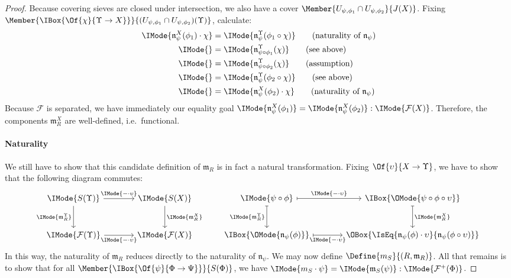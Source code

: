 \documentclass{article}
\newcommand\AIsEq[2]{\IMode{#1} &=\IMode{#2}}
\newcommand\Plus[1]{{#1}^+}
\newcommand\IsEqOf[3]{\IMode{#1}=\IMode{#2}:\IMode{#3}}
\begin{document}
\begin{proof}
  Because covering sieves are closed under intersection, we also have
  a cover $\Member{U_{\psi,\phi_1}\cap U_{\psi,\phi_2}}{J(X)}$. Fixing
  $\Member{\IBox{\Of{\chi}{\Upsilon\to X}}}{(U_{\psi,\phi_1}\cap
    U_{\psi,\phi_2})(\Upsilon)}$, calculate:
  \begin{align*}
    \AIsEq{
      \mathfrak{n}_\psi^X(\phi_1)\cdot \chi
    }{
      \mathfrak{n}_\psi^\Upsilon(\phi_1\circ\chi)
    }
    \tag{naturality of $\mathfrak{n}_\psi$}
    \\
    \AIsEq{
    }{
      \mathfrak{n}_{\psi\circ\phi_1}^\Upsilon(\chi)
    }
    \tag{see above}
    \\
    \AIsEq{
    }{
      \mathfrak{n}_{\psi\circ\phi_2}^\Upsilon(\chi)
    }
    \tag{assumption}
    \\
    \AIsEq{
    }{
      \mathfrak{n}_\psi^\Upsilon(\phi_2\circ\chi)
    }
    \tag{see above}
    \\
    \AIsEq{
    }{
      \mathfrak{n}_\psi^X(\phi_2)\cdot\chi
    }
    \tag{naturality of $\mathfrak{n}_\psi$}
  \end{align*}
  Because $\mathcal{F}$ is separated, we have immediately our equality
  goal
  $\IsEqOf{\mathfrak{n}_\psi^X(\phi_1)}{\mathfrak{n}_\psi^X(\phi_2)}{\mathcal{F}(X)}$. Therefore,
  the components $\mathfrak{m}_R^X$ are well-defined, i.e.\ functional.

  \paragraph{Naturality}
  We still have to show that this candidate definition of
  $\mathfrak{m}_R$ is in fact a natural transformation. Fixing
  $\Of{\upsilon}{X\to\Upsilon}$, we have to show that the following
  diagram commutes:
  \[
    \begin{tikzcd}[sep=large]
      \IMode{S(\Upsilon)} \arrow[r,"\IMode{-\cdot\upsilon}"]
      \arrow[d,swap,"\IMode{\mathfrak{m}_R^\Upsilon}"] & \IMode{S(X)}
      \arrow[d,"\IMode{\mathfrak{m}_R^X}"]
      \\
      \IMode{\mathcal{F}(\Upsilon)} \arrow[r,swap,"\IMode{-\cdot\upsilon}"] &
      \IMode{\mathcal{F}(X)}
    \end{tikzcd}
    \qquad
    \begin{tikzcd}[sep=large]
      \IMode{\psi\circ\phi} \arrow[r,mapsto,"\IMode{-\cdot\upsilon}"]
      \arrow[d,mapsto,swap,"\IMode{\mathfrak{m}_R^\Upsilon}"] &
      \IBox{\OMode{\psi\circ\phi\circ\upsilon}}
      \arrow[d,mapsto,"\IMode{\mathfrak{m}_R^X}"]
      \\
      \IBox{\OMode{\mathfrak{n}_\psi(\phi)}}
      \arrow[r,mapsto,swap,"\IMode{-\cdot\upsilon}"] &
      \OBox{\IsEq{\mathfrak{n}_\psi(\phi)\cdot\upsilon}{\mathfrak{n}_\psi(\phi\circ\upsilon)}}
    \end{tikzcd}
  \]
  In this way, the naturality of $\mathfrak{m}_R$ reduces directly to
  the naturality of $\mathfrak{n}_\psi$. We may now define
  $\Define{m_S}{(R,\mathfrak{m}_R)}$.
%
  All that remains is to show that for all
  $\Member{\IBox{\Of{\psi}{\Phi\to\Psi}}}{S(\Phi)}$, we have
  $\IsEqOf{m_S\cdot\psi}{\mathfrak{m}_S(\psi)}{\Plus{\mathcal{F}}(\Phi)}$.


\end{proof}
\end{document}

